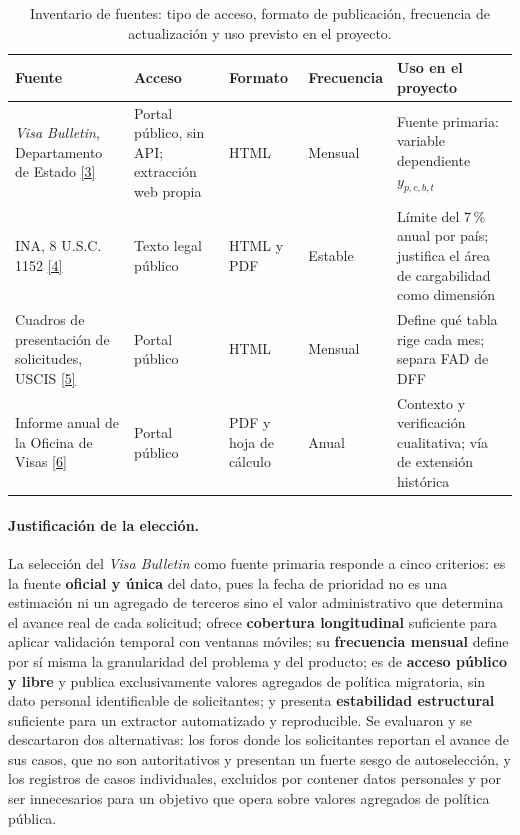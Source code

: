 \documentclass[12pt,letterpaper]{report}
\newcommand{\cita}[1]{\hyperref[bib:#1]{[#1]}}
\begin{document}
\begin{table}[htbp]
\centering
\footnotesize
\caption[Inventario de fuentes de datos]{Inventario de fuentes: tipo de acceso, formato de
publicación, frecuencia de actualización y uso previsto en el proyecto.}
\label{tab:inventario}
\begin{tabular}{p{2.9cm}p{2.4cm}p{1.7cm}p{1.75cm}p{4.25cm}}
\toprule
\rowcolor{uacjblue!15}
\textbf{Fuente} & \textbf{Acceso} & \textbf{Formato} & \textbf{Frecuencia} & \textbf{Uso en el proyecto} \\ \midrule
\textit{Visa Bulletin}, Departamento de Estado \cita{3} & Portal público, sin API; extracción web propia & HTML & Mensual & Fuente primaria: variable dependiente $y_{p,c,b,t}$ \\
INA, 8 U.S.C. 1152 \cita{4} & Texto legal público & HTML y PDF & Estable & Límite del 7\,\% anual por país; justifica el área de cargabilidad como dimensión \\
Cuadros de presentación de solicitudes, USCIS \cita{5} & Portal público & HTML & Mensual & Define qué tabla rige cada mes; separa FAD de DFF \\
Informe anual de la Oficina de Visas \cita{6} & Portal público & PDF y hoja de cálculo & Anual & Contexto y verificación cualitativa; vía de extensión histórica \\
\bottomrule
\end{tabular}
\end{table}

\paragraph{Justificación de la elección.} La selección del \textit{Visa Bulletin} como
fuente primaria responde a cinco criterios: es la fuente \textbf{oficial y única} del dato,
pues la fecha de prioridad no es una estimación ni un agregado de terceros sino el valor
administrativo que determina el avance real de cada solicitud; ofrece \textbf{cobertura
longitudinal} suficiente para aplicar validación temporal con ventanas móviles; su
\textbf{frecuencia mensual} define por sí misma la granularidad del problema y del
producto; es de \textbf{acceso público y libre} y publica exclusivamente valores agregados
de política migratoria, sin dato personal identificable de solicitantes; y presenta
\textbf{estabilidad estructural} suficiente para un extractor automatizado y reproducible.
Se evaluaron y se descartaron dos alternativas: los foros donde los solicitantes reportan
el avance de sus casos, que no son autoritativos y presentan un fuerte sesgo de
autoselección, y los registros de casos individuales, excluidos por contener datos
personales y por ser innecesarios para un objetivo que opera sobre valores agregados de
política pública.
\end{document}
